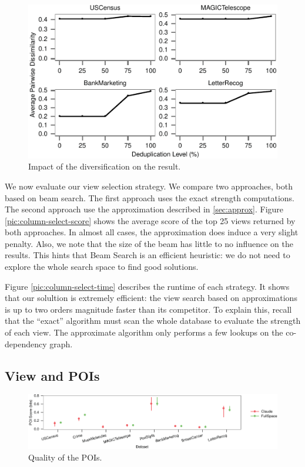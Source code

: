 \begin{figure}[t!]
\centering
\includegraphics[width=2.0\columnwidth]{plots/view-vary-diversification}
\caption{Impact of the diversification on the result.}
\label{pic:diversification}
\end{figure}

We now evaluate our view selection strategy. We compare two approaches, both
based on beam search. The first approach uses the exact strength computations.
The second approach use the approximation described in \ref{sec:approx}. Figure
\ref{pic:column-select-score} shows the average score of the top 25 views
returned by both approaches. In almost all cases, the approximation does induce
a very slight penalty. Also, we note that the size of the beam has little to no
influence on the results. This hints that Beam Search is an efficient
heuristic: we do not need to explore the whole search space to find good
solutions.

Figure \ref{pic:column-select-time} describes the runtime of each strategy. It
shows that our solultion is extremely efficient: the view search based on
approximations is up to two orders magnitude faster than its competitor. To
explain this, recall that the ``exact'' algorithm must scan the
whole database to evaluate the strength of each view. The approximate algorithm
only performs a few lookups on the co-dependency graph.

\subsection{View and POIs}
\begin{figure}[t!]
\centering
\includegraphics[width=2\columnwidth]{plots/POI-score}
\caption{Quality of the POIs.}
\label{pic:POI-quali}
\end{figure}


